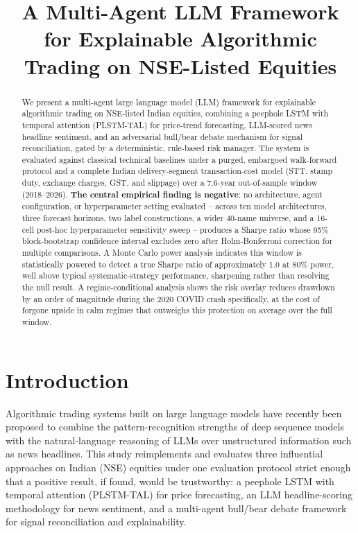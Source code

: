 \documentclass[10pt,conference]{IEEEtran}
\title{A Multi-Agent LLM Framework for Explainable Algorithmic Trading on NSE-Listed Equities}
\author{\IEEEauthorblockN{Author Name}\IEEEauthorblockA{Institution}}
\begin{document}
\maketitle

\begin{abstract}
We present a multi-agent large language model (LLM) framework for
explainable algorithmic trading on NSE-listed Indian equities, combining a
peephole LSTM with temporal attention (PLSTM-TAL) for price-trend forecasting,
LLM-scored news headline sentiment, and an adversarial bull/bear debate
mechanism for signal reconciliation, gated by a deterministic, rule-based risk
manager. The system is evaluated against classical technical baselines under a
purged, embargoed walk-forward protocol and a complete Indian delivery-segment
transaction-cost model (STT, stamp duty, exchange charges, GST, and slippage)
over a 7.6-year out-of-sample window (2018--2026). \textbf{The central
empirical finding is negative}: no architecture, agent configuration, or
hyperparameter setting evaluated -- across ten model architectures, three
forecast horizons, two label constructions, a wider 40-name universe, and a
16-cell post-hoc hyperparameter sensitivity sweep -- produces a Sharpe ratio
whose 95\% block-bootstrap confidence interval excludes zero after Holm-Bonferroni
correction for multiple comparisons. A Monte Carlo power analysis indicates
this window is statistically powered to detect a true Sharpe ratio of
approximately 1.0 at 80\% power, well above typical systematic-strategy
performance, sharpening rather than resolving the null result. A regime-conditional
analysis shows the risk overlay reduces drawdown by an order of magnitude
during the 2020 COVID crash specifically, at the cost of forgone upside in
calm regimes that outweighs this protection on average over the full window.
\end{abstract}

\section{Introduction}
Algorithmic trading systems built on large language models have recently been
proposed to combine the pattern-recognition strengths of deep sequence models
with the natural-language reasoning of LLMs over unstructured information such
as news headlines. This study reimplements and evaluates three influential
approaches on Indian (NSE) equities under one evaluation protocol strict
enough that a positive result, if found, would be trustworthy: a peephole
LSTM with temporal attention (PLSTM-TAL) for price forecasting, an LLM
headline-scoring methodology for news sentiment, and a multi-agent bull/bear
debate framework for signal reconciliation and explainability.
\end{document}
